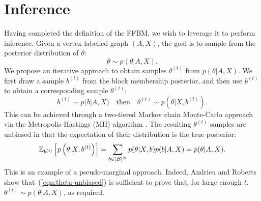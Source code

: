 \section{Inference}
\label{sec:inference}

Having completed the definition of the FFBM, we wish to leverage it 
to perform inference. Given a vertex-labelled graph $(A, X)$,
the goal is to sample from the posterior distribution
of $\theta$:
%
\begin{equation}
	\label{eqn:theta-target}
	\theta \sim p(\theta | A, X).
\end{equation}
%
We propose an iterative approach to obtain samples
$\theta^{(t)}$ from $p(\theta|A,X)$. We first draw a sample $b^{(t)}$ 
from the block membership posterior,
and then use $b^{(t)}$ to obtain a corresponding
sample $\theta^{(t)}$:
%
\begin{equation}
	b^{(t)} \sim p \Big( b | A, X \Big) \quad \textrm{then} \quad
	\theta^{(t)} \sim p\left(\theta | X, b^{(t)} \right).
\end{equation}
%
This can be achieved through a two-tiered
Markov chain Monte-Carlo approach via the Metropolis-Hastings (MH) 
algorithm \cite{hastings-alg}.
The resulting $\theta^{(t)}$ samples are unbiased in that the expectation of 
their distribution is the true posterior:
%
\begin{equation}
\mathbb{E}_{b^{(t)}} \left[p \left( \theta | X, b^{(t)} \right) \right] = \sum_{b \in [B]^N} p(\theta | X, b) p(b | A, X) = p(\theta | A, X).
\label{eqn:theta-unbiased}
\end{equation}
%
This is an example of a pseudo-marginal approach. Indeed, Andrieu and Roberts \cite{pseudo-marginal} show that~(\ref{eqn:theta-unbiased})
is sufficient to prove that, for large enough $t$, $\theta^{(t)} \sim p(\theta | A, X)$, as required.
%
